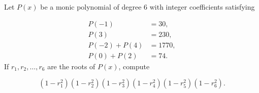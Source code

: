 Let $P(x)$ be a monic polynomial of degree $6$ with integer coefficients satisfying

\begin{align*}
P(-1)&=30,\\
P(3)&=230,\\
P(-2)+P(4)&=1770,\\
P(0)+P(2)&=74.
\end{align*}If $r_1,r_2,\dots,r_6$ are the roots of $P(x)$, compute

$$(1-r^2_1)(1-r^2_2)(1-r^2_3)(1-r^2_4)(1-r^2_5)(1-r^2_6).$$
